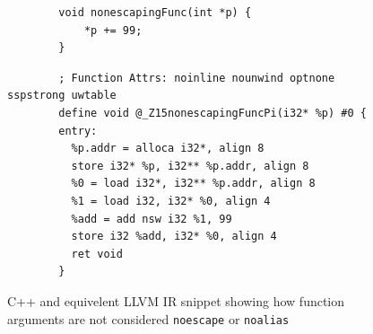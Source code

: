 \documentclass{mpaper}
\begin{document}
    \begin{figure}
        \centering
        \begin{verbatim}
        void nonescapingFunc(int *p) {
            *p += 99;
        }
        \end{verbatim}
        \begin{verbatim}
        ; Function Attrs: noinline nounwind optnone sspstrong uwtable
        define void @_Z15nonescapingFuncPi(i32* %p) #0 {
        entry:
          %p.addr = alloca i32*, align 8
          store i32* %p, i32** %p.addr, align 8
          %0 = load i32*, i32** %p.addr, align 8
          %1 = load i32, i32* %0, align 4
          %add = add nsw i32 %1, 99
          store i32 %add, i32* %0, align 4
          ret void
        }
        \end{verbatim}
        \caption{C++ and equivelent LLVM IR snippet showing how function arguments are not considered \texttt{noescape} or \texttt{noalias}}
        \label{fig:function-arguments}
    \end{figure}
    
\end{document}
